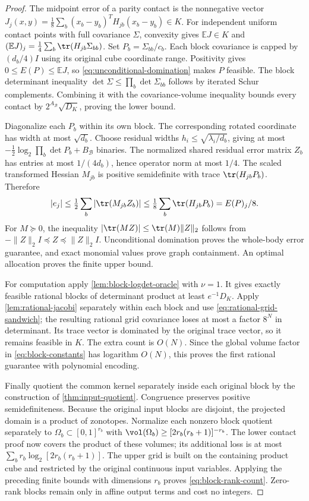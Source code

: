 \begin{proof}
The midpoint error of a parity contact is the nonnegative vector
$J_j(x,y)=\frac18\sum_b(x_b-y_b)^TH_{jb}(x_b-y_b)\in K$.
For independent uniform contact points with full covariance $\Sigma$,
convexity gives $\mathbb EJ\in K$ and
$(\mathbb EJ)_j=\frac14\sum_b\tr(H_{jb}\Sigma_{bb})$.
Set $P_b=\Sigma_{bb}/c_b$. Each block covariance is capped by
$(d_b/4)I$ using its original cube coordinate range. Positivity gives
$0\le E(P)\le\mathbb EJ$, so \eqref{eq:unconditional-domination}
makes $P$ feasible. The block determinant inequality
$\det\Sigma\le\prod_b\det\Sigma_{bb}$ follows by iterated Schur
complements. Combining it with the covariance-volume inequality bounds
every contact by $2^{A_{\mathcal B}}\sqrt{D_K}$, proving the lower bound.

Diagonalize each $P_b$ within its own block. The corresponding rotated
coordinate has width at most $\sqrt{d_b}$. Choose residual widths
$h_i\le\sqrt{\lambda_i/d_b}$, giving at most
$-\frac12\log_2\prod_b\det P_b+B_{\mathcal B}$ binaries. The normalized
shared residual error matrix $Z_b$ has entries at most $1/(4d_b)$,
hence operator norm at most $1/4$. The scaled transformed Hessian
$M_{jb}$ is positive semidefinite with trace $\tr(H_{jb}P_b)$. Therefore
\[
 |e_j|\le\tfrac12\sum_b|\tr(M_{jb}Z_b)|
 \le\tfrac18\sum_b\tr(H_{jb}P_b)=E(P)_j/8.
\]
For $M\succeq0$, the inequality $|\tr(MZ)|\le\tr(M)\|Z\|_2$ follows
from $-\|Z\|_2I\preceq Z\preceq\|Z\|_2I$. Unconditional domination
proves the whole-body error guarantee, and exact monomial values prove
graph containment. An optimal allocation proves the finite upper bound.

For computation apply \cref{lem:block-logdet-oracle} with $\nu=1$.
It gives exactly feasible rational blocks of determinant product at
least $e^{-1}D_K$. Apply \cref{lem:rational-jacobi} separately within
each block and use \eqref{eq:rational-grid-sandwich}; the resulting
rational grid covariance loses at most a factor $8^N$ in determinant.
Its trace vector is dominated by the original trace vector, so it remains
feasible in $K$. The extra count is $O(N)$. Since the global volume
factor in \eqref{eq:block-constants} has logarithm $O(N)$, this proves
the first rational guarantee with polynomial encoding.

Finally quotient the common kernel separately inside each original
block by the construction of \cref{thm:input-quotient}. Congruence
preserves positive semidefiniteness. Because the original input blocks
are disjoint, the projected domain is a product of zonotopes. Normalize
each nonzero block quotient separately to
$\Omega_b\subset[0,1]^{r_b}$ with
$\vol(\Omega_b)\ge[2r_b(r_b+1)]^{-r_b}$. The lower contact proof now
covers the product of these volumes; its additional loss is at most
$\sum_br_b\log_2[2r_b(r_b+1)]$. The upper grid is built on the
containing product cube and restricted by the original continuous input
variables. Applying the preceding finite bounds with dimensions $r_b$
proves \eqref{eq:block-rank-count}. Zero-rank blocks remain only in
affine output terms and cost no integers.
\end{proof}

